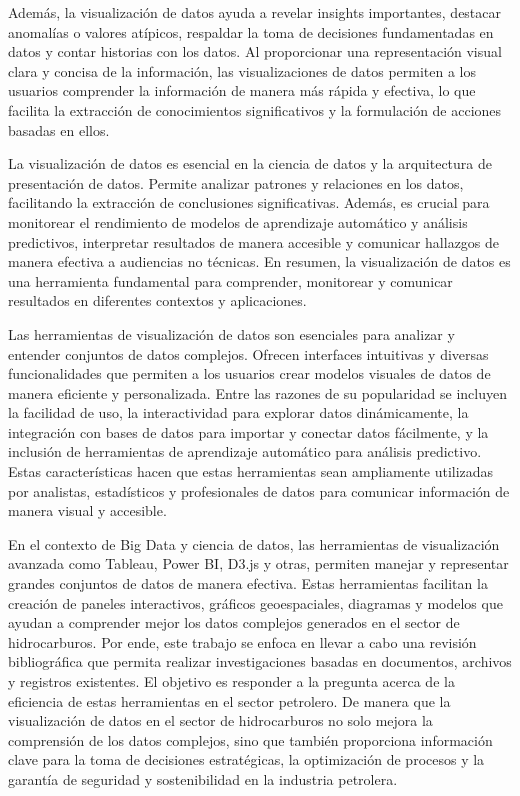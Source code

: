\documentclass[
  11pt,
  bookmarksnumbered]{article}
\begin{document}
Además, la visualización de datos ayuda a revelar insights importantes, destacar anomalías o valores atípicos, respaldar la toma de decisiones fundamentadas en datos y contar historias con los datos.
Al proporcionar una representación visual clara y concisa de la información, las visualizaciones de datos permiten a los usuarios comprender la información de manera más rápida y efectiva, lo que facilita la extracción de conocimientos significativos y la formulación de acciones basadas en ellos.

La visualización de datos es esencial en la ciencia de datos y la arquitectura de presentación de datos.
Permite analizar patrones y relaciones en los datos, facilitando la extracción de conclusiones significativas.
Además, es crucial para monitorear el rendimiento de modelos de aprendizaje automático y análisis predictivos, interpretar resultados de manera accesible y comunicar hallazgos de manera efectiva a audiencias no técnicas.
En resumen, la visualización de datos es una herramienta fundamental para comprender, monitorear y comunicar resultados en diferentes contextos y aplicaciones.

Las herramientas de visualización de datos son esenciales para analizar y entender conjuntos de datos complejos.
Ofrecen interfaces intuitivas y diversas funcionalidades que permiten a los usuarios crear modelos visuales de datos de manera eficiente y personalizada.
Entre las razones de su popularidad se incluyen la facilidad de uso, la interactividad para explorar datos dinámicamente, la integración con bases de datos para importar y conectar datos fácilmente, y la inclusión de herramientas de aprendizaje automático para análisis predictivo.
Estas características hacen que estas herramientas sean ampliamente utilizadas por analistas, estadísticos y profesionales de datos para comunicar información de manera visual y accesible.

En el contexto de Big Data y ciencia de datos, las herramientas de visualización avanzada como Tableau, Power BI, D3.js y otras, permiten manejar y representar grandes conjuntos de datos de manera efectiva.
Estas herramientas facilitan la creación de paneles interactivos, gráficos geoespaciales, diagramas y modelos que ayudan a comprender mejor los datos complejos generados en el sector de hidrocarburos.
Por ende, este trabajo se enfoca en llevar a cabo una revisión bibliográfica que permita realizar investigaciones basadas en documentos, archivos y registros existentes.
El objetivo es responder a la pregunta acerca de la eficiencia de estas herramientas en el sector petrolero.
De manera que la visualización de datos en el sector de hidrocarburos no solo mejora la comprensión de los datos complejos, sino que también proporciona información clave para la toma de decisiones estratégicas, la optimización de procesos y la garantía de seguridad y sostenibilidad en la industria petrolera.
\end{document}
